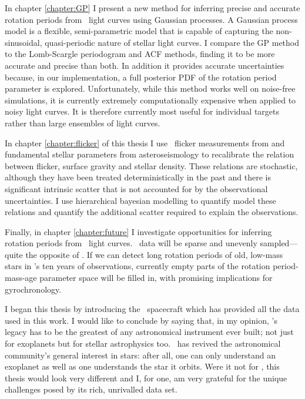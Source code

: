 In chapter \ref{chapter:GP} I present a new method for inferring precise and
accurate rotation periods from \kepler\ light curves using Gaussian processes.
A Gaussian process model is a flexible, semi-parametric model that is capable
of capturing the non-sinusoidal, quasi-periodic nature of stellar light
curves.
I compare the GP method to the Lomb-Scargle periodogram and ACF methods,
finding it to be more accurate and precise than both.
In addition it provides accurate uncertainties because, in our implementation,
a full posterior PDF of the rotation period parameter is explored.
Unfortunately, while this method works well on noise-free simulations, it is
currently extremely computationally expensive when applied to noisy light
curves.
It is therefore currently most useful for individual targets rather than large
ensembles of light curves.

In chapter \ref{chapter:flicker} of this thesis I use \kepler\ flicker
measurements from \citet{Bastien2013} and fundamental stellar parameters from
asteroseismology to recalibrate the relation between flicker, surface gravity
and stellar density.
These relations are stochastic, although they have been treated
deterministically in the past \citep[\eg][]{Bastien2013, Kipping2014} and
there is significant intrinsic scatter that is not accounted for by the
observational uncertainties.
I use hierarchical bayesian modelling to quantify  model these relations and
quantify the additional scatter required to explain the observations.

Finally, in chapter \ref{chapter:future} I investigate opportunities for
inferring rotation periods from \LSST\ light curves.
\LSST\ data will be sparse and unevenly sampled---quite the opposite of
\kepler.
If we can detect long rotation periods of old, low-mass stars in \LSST's ten
years of observations, currently empty parts of the rotation period-mass-age
parameter space will be filled in, with promising implications for
gyrochronology.

I began this thesis by introducing the \kepler\ spacecraft which has provided
all the data used in this work.
I would like to conclude by saying that, in my opinion, \kepler's legacy has
to be the greatest of any astronomical instrument ever built; not just for
exoplanets but for stellar astrophysics too.
\kepler\ has revived the astronomical community's general interest in stars:
after all, one can only understand an exoplanet as well as one understands the
star it orbits.
Were it not for \kepler, this thesis would look very different and I, for one,
am very grateful for the unique challenges posed by its rich, unrivalled data
set.
